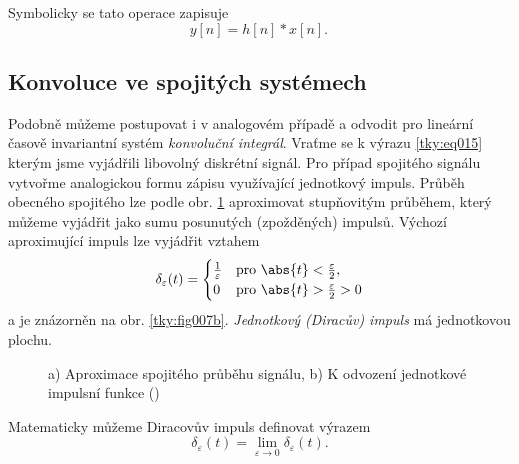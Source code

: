       Symbolicky se tato operace zapisuje 
      \begin{equation}\label{tky:eq026}
        \boxed{y[n] = h[n]*x[n]. \,}
      \end{equation}
      

    \subsection{Konvoluce ve spojitých systémech}\label{tky:IchIIsecIssecIII}
      Podobně můžeme postupovat i v analogovém případě a odvodit pro lineární časově invariantní
      systém \emph{konvoluční integrál}. Vraťme se k výrazu \ref{tky:eq015} kterým jsme vyjádřili
      libovolný diskrétní signál. Pro případ spojitého signálu vytvořme analogickou formu zápisu
      využívající jednotkový impuls. Průběh obecného spojitého lze podle obr. \ref{tky:fig007}
      aproximovat stupňovitým průběhem, který můžeme vyjádřit jako sumu posunutých (zpožděných)
      impulsů. Výchozí aproximující impuls lze vyjádřit vztahem
      \begin{equation}\label{tky:eq027}
          \delta_\varepsilon(t)  =
            \begin{cases}
               \frac{1}{\varepsilon} & \text{pro } \abs{t} < \frac{\varepsilon}{2},      \\
               0                  & \text{pro } \abs{t} > \frac{\varepsilon}{2} > 0
            \end{cases}
      \end{equation}
      a je znázorněn na obr. \ref{tky:fig007b}. \emph{Jednotkový (Diracův) impuls} 
      má jednotkovou plochu.
      \begin{figure}[ht!]
        \centering
        \caption{a) Aproximace spojitého průběhu signálu, b) K odvození jednotkové impulsní funkce 
        (\cite[s.~7]{Bicak2007})}
        \label{tky:fig007}
      \end{figure}
      Matematicky můžeme Diracovův impuls definovat výrazem
      \begin{equation}\label{tky:eq028}
        \delta_\varepsilon(t) = \lim_{\varepsilon\rightarrow0} \delta_\varepsilon(t).
      \end{equation}
